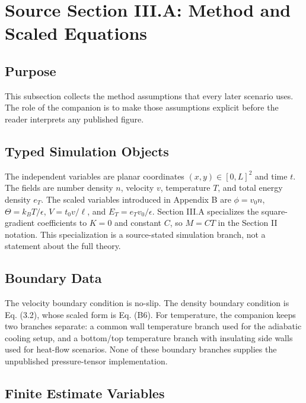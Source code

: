 \section{Source Section III.A: Method and Scaled Equations}
\label{sec:method-scaled-equations}


\subsection*{Purpose}

This subsection collects the method assumptions that every later scenario uses.
The role of the companion is to make those assumptions explicit before the
reader interprets any published figure.

\subsection*{Typed Simulation Objects}

The independent variables are planar coordinates \((x,y)\in[0,L]^2\) and time
\(t\).  The fields are number density \(n\), velocity \(v\), temperature \(T\),
and total energy density \(e_T\).  The scaled variables introduced in Appendix B
are \(\phi=v_0 n\), \(\Theta=k_B T/\epsilon\), \(V=t_0v/\ell\), and
\(E_T=e_Tv_0/\epsilon\).  Section III.A specializes the square-gradient
coefficients to \(K=0\) and constant \(C\), so \(M=CT\) in the Section II
notation.  This specialization is a source-stated simulation branch, not a
statement about the full theory.

\subsection*{Boundary Data}

The velocity boundary condition is no-slip.  The density boundary condition is
Eq. (3.2), whose scaled form is Eq. (B6).  For temperature, the companion keeps
two branches separate: a common wall temperature branch used for the adiabatic
cooling setup, and a bottom/top temperature branch with insulating side walls
used for heat-flow scenarios.  None of these boundary branches supplies the
unpublished pressure-tensor implementation.

\subsection*{Finite Estimate Variables}

